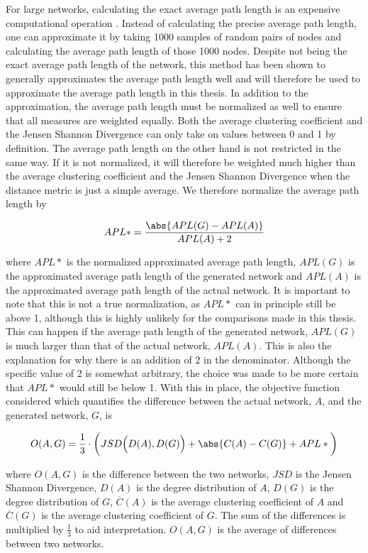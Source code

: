 \documentclass[11pt]{article}
\DeclarePairedDelimiter{\abs}\lvert\rvert
\begin{document}
For large networks, calculating the exact average path length is an expensive computational operation  \cite{matsumura_average_2018}. Instead of calculating the precise average path length, one can approximate it by taking 1000 samples of random pairs of nodes and calculating the average path length of those 1000 nodes. Despite not being the exact average path length of the network, this method has been shown to generally approximates the average path length well \cite{matsumura_average_2018} and will therefore be used to approximate the average path length in this thesis. 
In addition to the approximation, the average path length must be normalized as well to ensure that all measures are weighted equally. Both the average clustering coefficient and the Jensen Shannon Divergence can only take on values between 0 and 1 by definition. The average path length on the other hand is not restricted in the same way. If it is not normalized, it will therefore be weighted much higher than the average clustering coefficient and the Jensen Shannon Divergence when the distance metric is just a simple average. We therefore normalize the average path length by

$$APL* = \frac{\abs{APL(G) - APL(A)}}{APL(A)+2}$$

where $APL*$ is the normalized approximated average path length, $APL(G)$ is the approximated average path length of the generated network and $APL(A)$ is the approximated average path length of the actual network. It is important to note that this is not a true normalization, as $APL*$ can in principle still be above 1, although this is highly unlikely for the comparisons made in this thesis. This can happen if the average path length of the generated network, $APL(G)$ is much larger than that of the actual network, $APL(A)$. This is also the explanation for why there is an addition of 2 in the denominator. Although the specific value of 2 is somewhat arbitrary, the choice was made to be more certain that $APL*$ would still be below 1.
With this in place, the objective function considered which quantifies the difference between the actual network, $A$, and the generated network, $G$, is 

$$ O(A, G) = \frac{1}{3} \cdot \bigg(JSD \Big(D(A), D(G) \Big) + \abs{C(A) - C(G)} + APL*\bigg)$$

where $O(A, G)$ is the difference between the two networks, $JSD$ is the Jensen Shannon Divergence, $D(A)$ is the degree distribution of $A$, $D(G)$ is the degree distribution of $G$, $\overline{C}(A)$ is the average clustering coefficient of $A$ and $\overline{C}(G)$ is the average clustering coefficient of $G$. The sum of the differences is multiplied by $\frac{1}{3}$ to aid interpretation. $O(A,G)$ is the average of differences between two networks.
\end{document}
